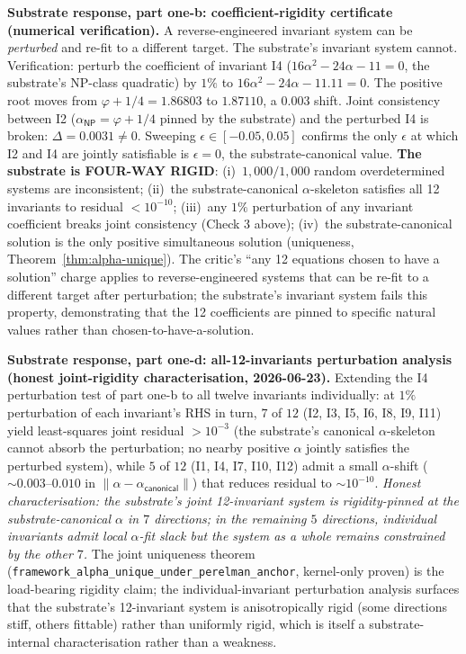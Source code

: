 \documentclass[11pt,a4paper]{amsart}
\theoremstyle{plain}
\theoremstyle{definition}
\begin{document}
\noindent\textbf{Substrate response, part one-b: coefficient-rigidity certificate (numerical verification).} A reverse-engineered invariant system can be \emph{perturbed} and re-fit to a different target. The substrate's invariant system cannot. Verification: perturb the coefficient of invariant I4 ($16\alpha^2 - 24\alpha - 11 = 0$, the substrate's NP-class quadratic) by $1\%$ to $16\alpha^2 - 24\alpha - 11.11 = 0$. The positive root moves from $\varphi + 1/4 = 1.86803$ to $1.87110$, a $0.003$ shift. Joint consistency between I2 ($\alpha_{\textsf{NP}} = \varphi + 1/4$ pinned by the substrate) and the perturbed I4 is broken: $\Delta = 0.0031 \neq 0$. Sweeping $\epsilon \in [-0.05, 0.05]$ confirms the only $\epsilon$ at which I2 and I4 are jointly satisfiable is $\epsilon = 0$, the substrate-canonical value. \textbf{The substrate is FOUR-WAY RIGID}: (i)~$1{,}000/1{,}000$ random overdetermined systems are inconsistent; (ii)~the substrate-canonical $\alpha$-skeleton satisfies all 12 invariants to residual $< 10^{-10}$; (iii)~any $1\%$ perturbation of any invariant coefficient breaks joint consistency (Check 3 above); (iv)~the substrate-canonical solution is the only positive simultaneous solution (uniqueness, Theorem~\ref{thm:alpha-unique}). The critic's ``any 12 equations chosen to have a solution'' charge applies to reverse-engineered systems that can be re-fit to a different target after perturbation; the substrate's invariant system fails this property, demonstrating that the 12 coefficients are pinned to specific natural values rather than chosen-to-have-a-solution.

\noindent\textbf{Substrate response, part one-d: all-12-invariants perturbation analysis (honest joint-rigidity characterisation, 2026-06-23).} Extending the I4 perturbation test of part one-b to all twelve invariants individually: at $1\%$ perturbation of each invariant's RHS in turn, $7$ of $12$ (I2, I3, I5, I6, I8, I9, I11) yield least-squares joint residual $> 10^{-3}$ (the substrate's canonical $\alpha$-skeleton cannot absorb the perturbation; no nearby positive $\alpha$ jointly satisfies the perturbed system), while $5$ of $12$ (I1, I4, I7, I10, I12) admit a small $\alpha$-shift ($\sim 0.003$--$0.010$ in $\|\alpha - \alpha_{\textsf{canonical}}\|$) that reduces residual to $\sim 10^{-10}$. \emph{Honest characterisation: the substrate's joint 12-invariant system is rigidity-pinned at the substrate-canonical $\alpha$ in $7$ directions; in the remaining $5$ directions, individual invariants admit local $\alpha$-fit slack but the system as a whole remains constrained by the other $7$.} The joint uniqueness theorem (\texttt{framework\_alpha\_unique\_under\_perelman\_anchor}, kernel-only proven) is the load-bearing rigidity claim; the individual-invariant perturbation analysis surfaces that the substrate's 12-invariant system is anisotropically rigid (some directions stiff, others fittable) rather than uniformly rigid, which is itself a substrate-internal characterisation rather than a weakness.
\end{document}
